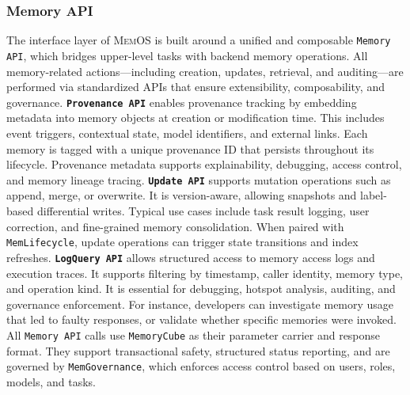 \documentclass[]{memtensor}
\begin{document}
\subsubsection{Memory API}
The interface layer of \textsc{MemOS} is built around a unified and composable \texttt{Memory API}, which bridges upper-level tasks with backend memory operations. All memory-related actions—including creation, updates, retrieval, and auditing—are performed via standardized APIs that ensure extensibility, composability, and governance.
\textbf{\texttt{Provenance API}} enables provenance tracking by embedding metadata into memory objects at creation or modification time. This includes event triggers, contextual state, model identifiers, and external links. Each memory is tagged with a unique provenance ID that persists throughout its lifecycle. Provenance metadata supports explainability, debugging, access control, and memory lineage tracing.
\textbf{\texttt{Update API}} supports mutation operations such as append, merge, or overwrite. It is version-aware, allowing snapshots and label-based differential writes. Typical use cases include task result logging, user correction, and fine-grained memory consolidation. When paired with \texttt{MemLifecycle}, update operations can trigger state transitions and index refreshes.
\textbf{\texttt{LogQuery API}} allows structured access to memory access logs and execution traces. It supports filtering by timestamp, caller identity, memory type, and operation kind. It is essential for debugging, hotspot analysis, auditing, and governance enforcement. For instance, developers can investigate memory usage that led to faulty responses, or validate whether specific memories were invoked.
All \texttt{Memory API} calls use \texttt{MemoryCube} as their parameter carrier and response format. They support transactional safety, structured status reporting, and are governed by \texttt{MemGovernance}, which enforces access control based on users, roles, models, and tasks.
\end{document}
